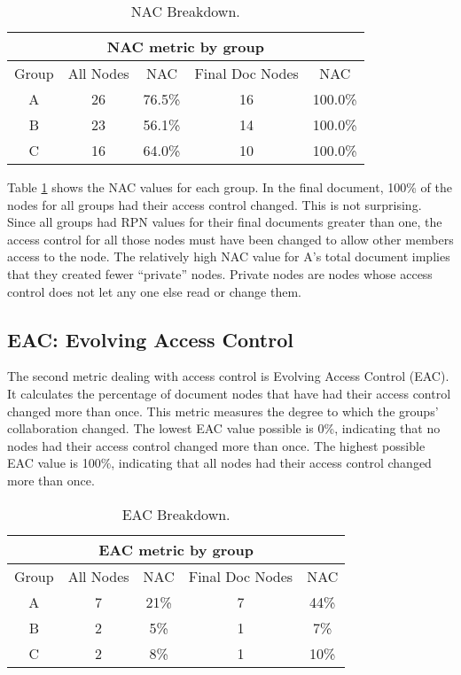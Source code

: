 \small
\begin{table}[htb]
  \caption{NAC Breakdown.}
  \begin{center}
    \begin{tabular}{|c|c|c|c|c|}
      \hline
      \multicolumn{5}{|c|}{\rule[-3mm]{0mm}{8mm}\bf NAC metric by group}\\ \hline
      Group&All Nodes&NAC&Final Doc Nodes&NAC\\ \hline
      \hline
      A&26&76.5\%&16&100.0\%\\ \hline
      B&23&56.1\%&14&100.0\%\\ \hline
      C&16&64.0\%&10&100.0\%\\ \hline
    \end{tabular}
  \end{center}
  \label{tab:access-control}
\end{table}
\normalsize

Table \ref{tab:access-control} shows the NAC values for each group.  In the
final document, 100\% of the nodes for all groups had their access control
changed.  This is not surprising.  Since all groups had RPN values for their
final documents greater than one, the access control for all those nodes
must have been changed to allow other members access to the node.  The
relatively high NAC value for A's total document implies that they
created fewer ``private'' nodes.  Private nodes are nodes whose access
control does not let any one else read or change them.

\subsection{EAC: Evolving Access Control}

The second metric dealing with access control is Evolving Access Control
(EAC). It calculates the percentage of document nodes that have had their
access control changed more than once. This metric measures the degree to
which the groups' collaboration changed. The lowest EAC value possible is
0\%, indicating that no nodes had their access control changed more than
once.  The highest possible EAC value is 100\%, indicating that all nodes
had their access control changed more than once.

\small
\begin{table}[htb]
  \caption{EAC Breakdown.}
  \begin{center}
    \begin{tabular}{|c|c|c||c|c|}
      \hline
      \multicolumn{5}{|c|}{\rule[-3mm]{0mm}{8mm}\bf EAC metric by group}\\ 
      \hline
      Group&All Nodes&NAC&Final Doc Nodes&NAC\\ \hline
      \hline
      A&7&21\%&7&44\%\\ \hline
      B&2&5\%&1&7\%\\ \hline
      C&2&8\%&1&10\%\\ \hline
    \end{tabular}
  \end{center}
  \label{tab:d-access-control}
\end{table}
\normalsize

